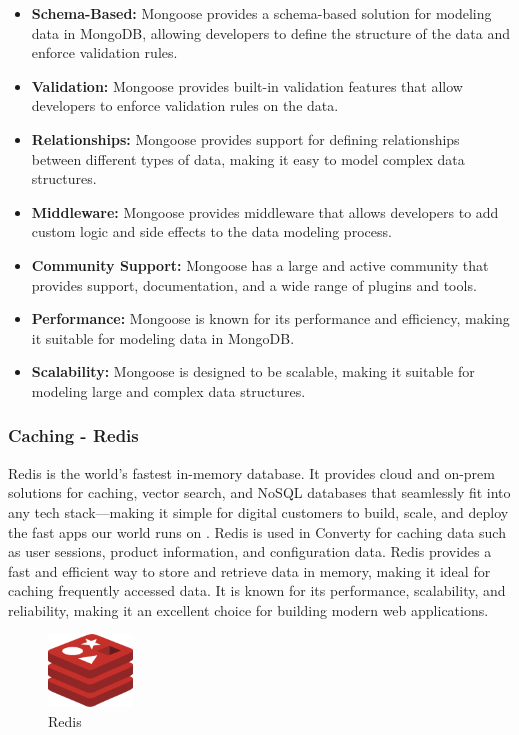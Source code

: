 \begin{itemize}
    \item \textbf{Schema-Based:} Mongoose provides a schema-based solution for modeling data in MongoDB, allowing developers to define the structure of the data and enforce validation rules.
    \item \textbf{Validation:} Mongoose provides built-in validation features that allow developers to enforce validation rules on the data.
    \item \textbf{Relationships:} Mongoose provides support for defining relationships between different types of data, making it easy to model complex data structures.
    \item \textbf{Middleware:} Mongoose provides middleware that allows developers to add custom logic and side effects to the data modeling process.
    \item \textbf{Community Support:} Mongoose has a large and active community that provides support, documentation, and a wide range of plugins and tools.
    \item \textbf{Performance:} Mongoose is known for its performance and efficiency, making it suitable for modeling data in MongoDB.
    \item \textbf{Scalability:} Mongoose is designed to be scalable, making it suitable for modeling large and complex data structures.
\end{itemize}

\subsubsection{Caching - Redis}
Redis is the world’s fastest in-memory database. It provides cloud and on-prem solutions for caching, vector search, and NoSQL databases that seamlessly fit into any tech stack—making it simple for digital customers to build, scale, and deploy the fast apps our world runs on \cite{redis}. Redis is used in Converty for caching data such as user sessions, product information, and configuration data. Redis provides a fast and efficient way to store and retrieve data in memory, making it ideal for caching frequently accessed data. It is known for its performance, scalability, and reliability, making it an excellent choice for building modern web applications.

\begin{figure}[H]
    \centering
    \includegraphics[width=0.2\textwidth]{Images/redis.png}
    \caption{Redis}
    \label{fig:redis}
\end{figure}

